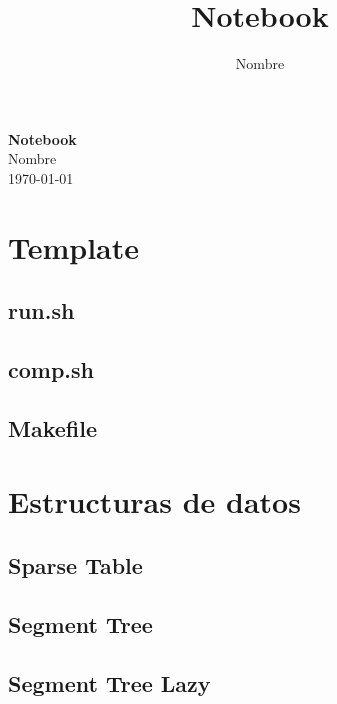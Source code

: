 \documentclass[a4paper,11pt,landscape,twocolumn]{article}
\title{Notebook}
\author{Nombre}
\begin{document}
\begin{center}
    \LARGE\textbf{Notebook}\\[1em]
    \large Nombre\\[1em]
    \normalsize \today\\[1em]
\end{center}

\tableofcontents

\section{Template}



\subsection{run.sh}



\subsection{comp.sh}



\subsection{Makefile}



\section{Estructuras de datos}

\subsection{Sparse Table}



\subsection{Segment Tree}



\subsection{Segment Tree Lazy}
\end{document}
